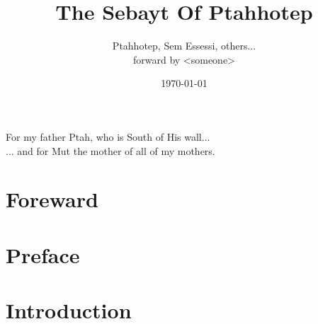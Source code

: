 \documentclass[a4paper,pagesize,8pt,pointlessnumbers,normalheadings]{book}
\title{The Sebayt Of Ptahhotep}
\author{Ptahhotep, Sem Essessi, others...\\forward by <someone>}
\date{\today}
\begin{document}
\maketitle


\vspace*{\fill}
\begin{center}
For my father Ptah, who is South of His wall...\\
\vspace{15mm}
... and for Mut the mother of all of my mothers.
\end{center}
\vspace*{\fill}

\tableofcontents

\markboth{}{}

\chapter*{Foreward}



\chapter*{Preface}



\chapter*{Introduction}


\end{document}
